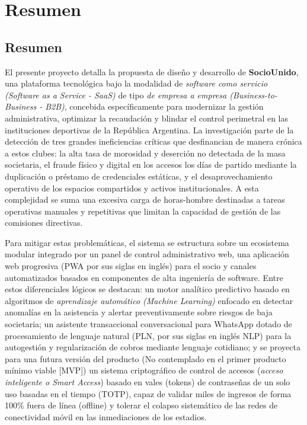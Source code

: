 \section{Resumen}

\subsection{Resumen}

El presente proyecto detalla la propuesta de diseño y desarrollo de \textbf{SocioUnido}, una plataforma tecnológica bajo la modalidad de \textit{software como servicio (Software as a Service - SaaS)} de tipo \textit{de empresa a empresa (Business-to-Business - B2B)}, concebida específicamente para modernizar la gestión administrativa, optimizar la recaudación y blindar el control perimetral en las instituciones deportivas de la República Argentina. La investigación parte de la detección de tres grandes ineficiencias críticas que desfinancian de manera crónica a estos clubes: la alta tasa de morosidad y deserción no detectada de la masa societaria, el fraude físico y digital en los accesos los días de partido mediante la duplicación o préstamo de credenciales estáticas, y el desaprovechamiento operativo de los espacios compartidos y activos institucionales. A esta complejidad se suma una excesiva carga de horas-hombre destinadas a tareas operativas manuales y repetitivas que limitan la capacidad de gestión de las comisiones directivas.

Para mitigar estas problemáticas, el sistema se estructura sobre un ecosistema modular integrado por un panel de control administrativo web, una aplicación web progresiva (PWA por sus siglas en inglés) para el socio y canales automatizados basados en componentes de alta ingeniería de software. Entre estos diferenciales lógicos se destacan: un motor analítico predictivo basado en algoritmos de \textit{aprendizaje automático (Machine Learning)} enfocado en detectar anomalías en la asistencia y alertar preventivamente sobre riesgos de baja societaria; un asistente transaccional conversacional para WhatsApp dotado de procesamiento de lenguaje natural (PLN, por sus siglas en inglés NLP) para la autogestión y regularización de cobros mediante lenguaje cotidiano; y se proyecta para una futura versión del producto (No contemplado en el primer producto mínimo viable [MVP]) un sistema criptográfico de control de accesos (\textit{acceso inteligente o Smart Access}) basado en vales (tokens) de contraseñas de un solo uso basadas en el tiempo (TOTP), capaz de validar miles de ingresos de forma 100\% fuera de línea (offline) y tolerar el colapso sistemático de las redes de conectividad móvil en las inmediaciones de los estadios.

